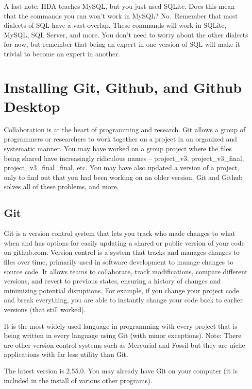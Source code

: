 \documentclass[
]{book}
\begin{document}
A last note: HDA teaches MySQL, but you just used SQLite. Does this mean that the commands you ran won't work in MySQL? No.~Remember that most dialects of SQL have a vast overlap. These commands will work in SQLite, MySQL, SQL Server, and more. You don't need to worry about the other dialects for now, but remember that being an expert in one version of SQL will make it trivial to become an expert in another.

\chapter{Installing Git, Github, and Github Desktop}\label{installing-git-github-and-github-desktop}

Collaboration is at the heart of programming and research. Git allows a group of programmers or researchers to work together on a project in an organized and systematic manner. You may have worked on a group project where the files being shared have increasingly ridiculous names -- project\_v3, project\_v3\_final, project\_v3\_final\_final, etc. You may have also updated a version of a project, only to find out that you had been working on an older version. Git and Github solves all of these problems, and more.

\section{Git}\label{installing-git}

Git is a version control system that lets you track who made changes to what when and has options for easily updating a shared or public version of your code on github.com. Version control is a system that tracks and manages changes to files over time, primarily used in software development to manage changes to source code. It allows teams to collaborate, track modifications, compare different versions, and revert to previous states, ensuring a history of changes and minimizing potential disruptions. For example, if you change your project code and break everything, you are able to instantly change your code back to earlier versions (that still worked).

It is the most widely used language in programming with every project that is being written in every language using Git (with minor exceptions). Note: There are other version control systems such as Mercurial and Fossil but they are niche applications with far less utility than Git.

The latest version is 2.55.0. You may already have Git on your computer (it is included in the install of various other programs).
\end{document}
